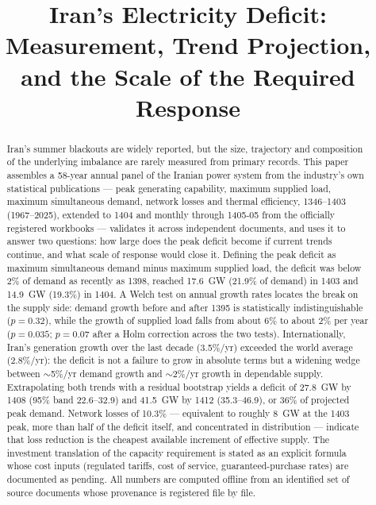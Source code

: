\documentclass[conference]{IEEEtran}
\begin{document}
\title{Iran's Electricity Deficit:\\ Measurement, Trend Projection, and the Scale of the Required Response}

\author{
}

\maketitle

\begin{abstract}
Iran's summer blackouts are widely reported, but the size, trajectory and composition of the underlying imbalance are rarely measured from primary records. This paper assembles a 58-year annual panel of the Iranian power system from the industry's own statistical publications --- peak generating capability, maximum supplied load, maximum simultaneous demand, network losses and thermal efficiency, 1346--1403 (1967--2025), extended to 1404 and monthly through 1405-05 from the officially registered workbooks --- validates it across independent documents, and uses it to answer two questions: how large does the peak deficit become if current trends continue, and what scale of response would close it. Defining the peak deficit as maximum simultaneous demand minus maximum supplied load, the deficit was below 2\% of demand as recently as 1398, reached 17.6~GW (21.9\% of demand) in 1403 and 14.9~GW (19.3\%) in 1404. A Welch test on annual growth rates locates the break on the supply side: demand growth before and after 1395 is statistically indistinguishable ($p=0.32$), while the growth of supplied load falls from about 6\% to about 2\% per year ($p=0.035$; $p=0.07$ after a Holm correction across the two tests). Internationally, Iran's generation growth over the last decade (3.5\%/yr) exceeded the world average (2.8\%/yr): the deficit is not a failure to grow in absolute terms but a widening wedge between $\sim$5\%/yr demand growth and $\sim$2\%/yr growth in dependable supply. Extrapolating both trends with a residual bootstrap yields a deficit of 27.8~GW by 1408 (95\% band 22.6--32.9) and 41.5~GW by 1412 (35.3--46.9), or 36\% of projected peak demand. Network losses of 10.3\% --- equivalent to roughly 8~GW at the 1403 peak, more than half of the deficit itself, and concentrated in distribution --- indicate that loss reduction is the cheapest available increment of effective supply. The investment translation of the capacity requirement is stated as an explicit formula whose cost inputs (regulated tariffs, cost of service, guaranteed-purchase rates) are documented as pending. All numbers are computed offline from an identified set of source documents whose provenance is registered file by file.
\end{abstract}
\end{document}
